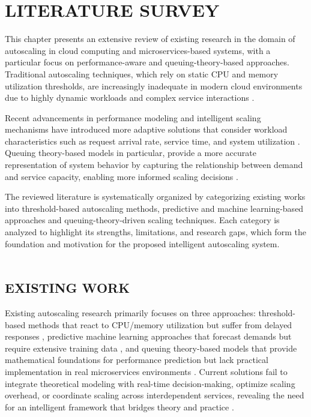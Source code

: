 \chapter{LITERATURE SURVEY}
\begingroup
{}
\sloppy

This chapter presents an extensive review of existing research in the domain of autoscaling in cloud computing and microservices-based systems, with a particular focus on performance-aware and queuing-theory-based approaches. Traditional autoscaling techniques, which rely on static CPU and memory utilization thresholds, are increasingly inadequate in modern cloud environments due to highly dynamic workloads and complex service interactions \cite{khaleq2021, fourati2021}.

Recent advancements in performance modeling and intelligent scaling mechanisms have introduced more adaptive solutions that consider workload characteristics such as request arrival rate, service time, and system utilization \cite{wang2024}. Queuing theory-based models in particular, provide a more accurate representation of system behavior by capturing the relationship between demand and service capacity, enabling more informed scaling decisions \cite{lai2025}.

The reviewed literature is systematically organized by categorizing existing works into threshold-based autoscaling methods, predictive and machine learning-based approaches and queuing-theory-driven scaling techniques. Each category is analyzed to highlight its strengths, limitations, and research gaps, which form the foundation and motivation for the proposed intelligent autoscaling system.\\
\\
\section{EXISTING WORK}

Existing autoscaling research primarily focuses on three approaches: threshold-based methods that react to CPU/memory utilization but suffer from delayed responses \cite{fourati2021}, predictive machine learning approaches that forecast demands but require extensive training data \cite{wang2024}, and queuing theory-based models that provide mathematical foundations for performance prediction but lack practical implementation in real microservices environments \cite{lai2025}. Current solutions fail to integrate theoretical modeling with real-time decision-making, optimize scaling overhead, or coordinate scaling across interdependent services, revealing the need for an intelligent framework that bridges theory and practice \cite{khaleq2021}.

